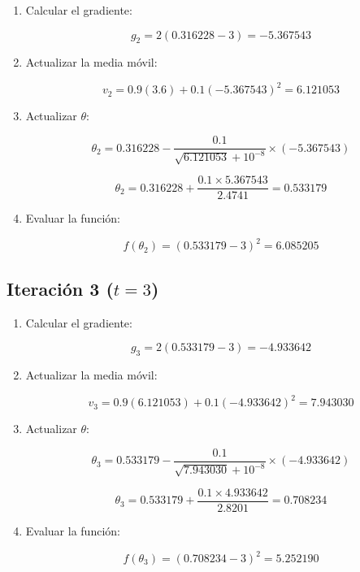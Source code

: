 \documentclass[a5paper]{article}
\begin{document}
	\begin{enumerate}
		\item Calcular el gradiente:
		
		\[
		g_2 = 2(0.316228 - 3) = -5.367543
		\]
		
		\item Actualizar la media móvil:
		
		\[
		v_2 = 0.9(3.6) + 0.1(-5.367543)^2 = 6.121053
		\]
		
		\item Actualizar \( \theta \):
		
		\[
		\theta_2 = 0.316228 - \frac{0.1}{\sqrt{6.121053} + 10^{-8}} \times (-5.367543)
		\]
		
		\[
		\theta_2 = 0.316228 + \frac{0.1 \times 5.367543}{2.4741} = 0.533179
		\]
		
		\item Evaluar la función:
		
		\[
		f(\theta_2) = (0.533179 - 3)^2 = 6.085205
		\]
	\end{enumerate}
	
	\subsection*{Iteración 3 (\( t = 3 \))}
	
	\begin{enumerate}
		\item Calcular el gradiente:
		
		\[
		g_3 = 2(0.533179 - 3) = -4.933642
		\]
		
		\item Actualizar la media móvil:
		
		\[
		v_3 = 0.9(6.121053) + 0.1(-4.933642)^2 = 7.943030
		\]
		
		\item Actualizar \( \theta \):
		
		\[
		\theta_3 = 0.533179 - \frac{0.1}{\sqrt{7.943030} + 10^{-8}} \times (-4.933642)
		\]
		
		\[
		\theta_3 = 0.533179 + \frac{0.1 \times 4.933642}{2.8201} = 0.708234
		\]
		
		\item Evaluar la función:
		
		\[
		f(\theta_3) = (0.708234 - 3)^2 = 5.252190
		\]
	\end{enumerate}
	
	
\end{document}
